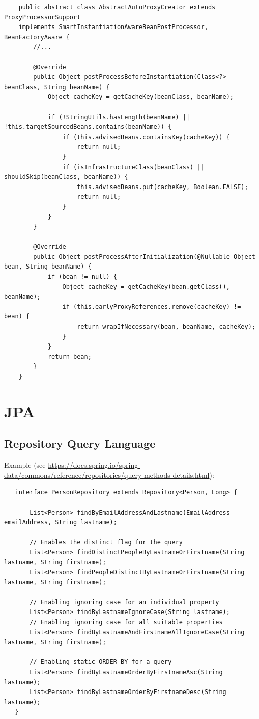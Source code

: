 \documentclass{scrartcl}
\begin{document}
\begin{lstlisting}
    public abstract class AbstractAutoProxyCreator extends ProxyProcessorSupport
    implements SmartInstantiationAwareBeanPostProcessor, BeanFactoryAware {
        //...

        @Override
        public Object postProcessBeforeInstantiation(Class<?> beanClass, String beanName) {
            Object cacheKey = getCacheKey(beanClass, beanName);

            if (!StringUtils.hasLength(beanName) || !this.targetSourcedBeans.contains(beanName)) {
                if (this.advisedBeans.containsKey(cacheKey)) {
                    return null;
                }
                if (isInfrastructureClass(beanClass) || shouldSkip(beanClass, beanName)) {
                    this.advisedBeans.put(cacheKey, Boolean.FALSE);
                    return null;
                }
            }
        }

        @Override
        public Object postProcessAfterInitialization(@Nullable Object bean, String beanName) {
            if (bean != null) {
                Object cacheKey = getCacheKey(bean.getClass(), beanName);
                if (this.earlyProxyReferences.remove(cacheKey) != bean) {
                    return wrapIfNecessary(bean, beanName, cacheKey);
                }
            }
            return bean;
        }
    }
\end{lstlisting}

\section{JPA}
\subsection{Repository Query Language}

Example (see \url{  https://docs.spring.io/spring-data/commons/reference/repositories/query-methods-details.html}):


\begin{lstlisting}
   interface PersonRepository extends Repository<Person, Long> {

       List<Person> findByEmailAddressAndLastname(EmailAddress emailAddress, String lastname);

       // Enables the distinct flag for the query
       List<Person> findDistinctPeopleByLastnameOrFirstname(String lastname, String firstname);
       List<Person> findPeopleDistinctByLastnameOrFirstname(String lastname, String firstname);

       // Enabling ignoring case for an individual property
       List<Person> findByLastnameIgnoreCase(String lastname);
       // Enabling ignoring case for all suitable properties
       List<Person> findByLastnameAndFirstnameAllIgnoreCase(String lastname, String firstname);

       // Enabling static ORDER BY for a query
       List<Person> findByLastnameOrderByFirstnameAsc(String lastname);
       List<Person> findByLastnameOrderByFirstnameDesc(String lastname);
   }
\end{lstlisting}
\end{document}
